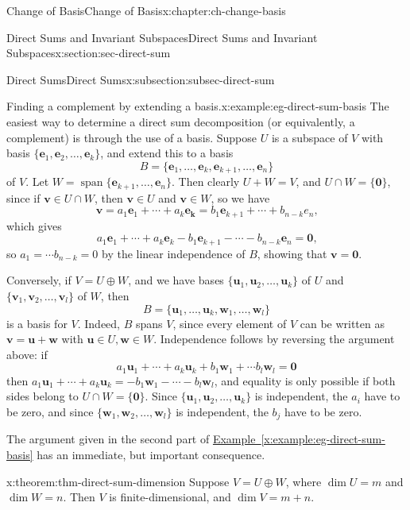 \documentclass[oneside,10pt,]{book}
\newcommand{\xreffont}{\relax}
\numberwithin{equation}{section}
\newcommand{\spn}{\operatorname{span}}
\newcommand{\uu}{\mathbf{u}}
\newcommand{\vv}{\mathbf{v}}
\newcommand{\ww}{\mathbf{w}}
\newcommand{\zer}{\mathbf{0}}
\newcommand{\basis}[2]{\{\mathbf{#1}_1,\mathbf{#1}_2,\ldots,\mathbf{#1}_{#2}\}}
\begin{document}
\begin{chapterptx}{Change of Basis}{}{Change of Basis}{}{}{x:chapter:ch-change-basis}
\begin{sectionptx}{Direct Sums and Invariant Subspaces}{}{Direct Sums and Invariant Subspaces}{}{}{x:section:sec-direct-sum}
\begin{subsectionptx}{Direct Sums}{}{Direct Sums}{}{}{x:subsection:subsec-direct-sum}
\begin{example}{Finding a complement by extending a basis.}{x:example:eg-direct-sum-basis}
The easiest way to determine a direct sum decomposition (or equivalently, a complement) is through the use of a basis. Suppose \(U\) is a subspace of \(V\) with basis \(\basis{e}{k}\), and extend this to a basis%
\begin{equation*}
B = \{\mathbf{e}_1,\ldots, \mathbf{e}_k,\mathbf{e}_{k+1},\ldots, \mathbf{e}_n\}
\end{equation*}
of \(V\). Let \(W = \spn\{\mathbf{e}_{k+1},\ldots, \mathbf{e}_n\}\). Then clearly \(U+W=V\), and \(U\cap W=\{\zer\}\), since if \(\vv\in U\cap W\), then \(\vv\in U\) and \(\vv\in W\), so we have%
\begin{equation*}
\vv = a_1\mathbf{e}_1+\cdots + a_k\mathbf{e_k} = b_1\mathbf{e}_{k+1}+\cdots+b_{n-k}e_{n}\text{,}
\end{equation*}
which gives%
\begin{equation*}
a_1\mathbf{e}_1+\cdots + a_k\mathbf{e}_k-b_1\mathbf{e}_{k+1}-\cdots - b_{n-k}\mathbf{e}_n=\zer\text{,}
\end{equation*}
so \(a_1=\cdots b_{n-k}=0\) by the linear independence of \(B\), showing that \(\vv=\zer\).%
\par
Conversely, if \(V=U\oplus W\), and we have bases \(\basis{u}{k}\) of \(U\) and \(\basis{v}{l}\) of \(W\), then%
\begin{equation*}
B = \{\uu_1,\ldots, \uu_k,\ww_1,\ldots, \ww_l\}
\end{equation*}
is a basis for \(V\). Indeed, \(B\) spans \(V\), since every element of \(V\) can be written as \(\vv=\uu+\ww\) with \(\uu\in U,\ww\in W\). Independence follows by reversing the argument above: if%
\begin{equation*}
a_1\uu_1+\cdots + a_k\uu_k+b_1\ww_1+\cdots b_l\ww_l=\zer
\end{equation*}
then \(a_1\uu_1+\cdots + a_k\uu_k = -b_1\ww_1-\cdots -b_l\ww_l\), and equality is only possible if both sides belong to \(U\cap W = \{\zer\}\). Since \(\basis{u}{k}\) is independent, the \(a_i\) have to be zero, and since \(\basis{w}{l}\) is independent, the \(b_j\) have to be zero.%
\end{example}
The argument given in the second part of \hyperref[x:example:eg-direct-sum-basis]{Example~{\xreffont\ref{x:example:eg-direct-sum-basis}}} has an immediate, but important consequence.%
\begin{theorem}{}{}{x:theorem:thm-direct-sum-dimension}%
Suppose \(V=U\oplus W\), where \(\dim U = m\) and \(\dim W = n\). Then \(V\) is finite-dimensional, and \(\dim V = m+n\).%
\end{theorem}

\end{subsectionptx}
\end{sectionptx}
\end{chapterptx}
\end{document}
